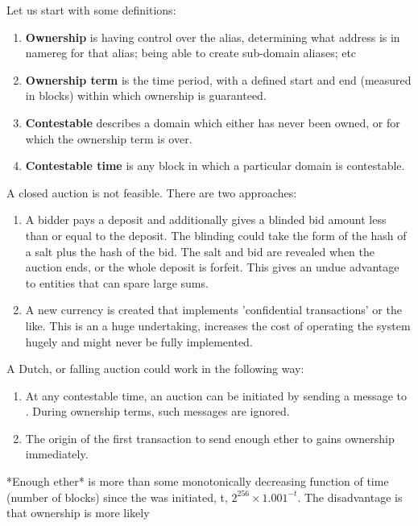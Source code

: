 \documentclass[10pt,a4paper]{article}
\begin{document}
{Let us start with some definitions:

\begin{enumerate}
\item{\bf Ownership} is having control over the alias, \eg determining what address is in namereg for that alias; being able to create sub-domain aliases; etc
\item{\bf Ownership term} is the time period, with a defined start and end (measured in blocks) within which ownership is guaranteed.
\item{\bf Contestable} describes a domain which either has never been owned, or for which the ownership term is over.
\item{\bf Contestable time} is any block in which a particular domain is contestable.
\end{enumerate}

A closed auction is not feasible. There are two approaches:

\begin{enumerate}
\item A bidder pays a deposit and additionally gives a blinded bid amount less than or equal to the deposit. The blinding could take the form of the hash of a salt plus the hash of the bid. The salt and bid are revealed when the auction ends, or the whole deposit is forfeit. This gives an undue advantage to entities that can spare large sums.
\item A new currency is created that implements 'confidential transactions' or the like. This is an a huge undertaking, increases the cost of operating the system hugely and might never be fully implemented.
\end{enumerate}

A Dutch, or falling auction could work in the following way:

\begin{enumerate}
\item At any contestable time, an auction can be initiated by sending a message to \ambedon. During ownership terms, such messages are ignored.
\item The origin of the first transaction to send enough ether to \ambedon gains ownership immediately.
\end{enumerate}

*Enough ether* is more than some monotonically decreasing function of time (number of blocks) since the was initiated, t, \eg $2^{256} \times 1.001^{-t}$. The disadvantage is that ownership is more likely 


}
\end{document}
